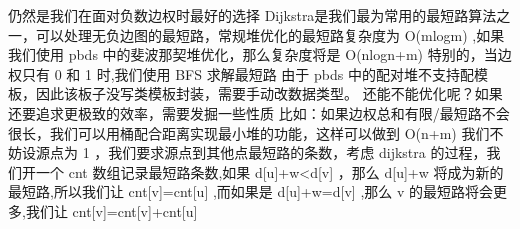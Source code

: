 {}\markdownRendererDollarSign{}仍然是我们在面对负数边权时最好的选择\markdownRendererInterblockSeparator
{}\markdownRendererInterblockSeparator
{}
\markdownRendererSectionEnd \markdownRendererSectionBegin
{}\markdownRendererInterblockSeparator
{}Dijkstra是我们最为常用的最短路算法之一，可以处理无负边图的最短路，常规堆优化的最短路复杂度为\markdownRendererDollarSign{} O(mlogm) \markdownRendererDollarSign{},如果我们使用\markdownRendererDollarSign{} pbds \markdownRendererDollarSign{}中的斐波那契堆优化，那么复杂度将是\markdownRendererDollarSign{} O(nlogn+m) \markdownRendererDollarSign{}\markdownRendererParagraphSeparator
{}特别的，当边权只有\markdownRendererDollarSign{} 0 \markdownRendererDollarSign{}和\markdownRendererDollarSign{} 1 \markdownRendererDollarSign{}时,我们使用\markdownRendererDollarSign{} BFS\markdownRendererSoftLineBreak
{}\markdownRendererDollarSign{}求解最短路\markdownRendererParagraphSeparator
{}由于\markdownRendererDollarSign{} pbds \markdownRendererDollarSign{}中的配对堆不支持配模板，因此该板子没写类模板封装，需要手动改数据类型。\markdownRendererInterblockSeparator
{}\markdownRendererInterblockSeparator
{}还能不能优化呢？如果还要追求更极致的效率，需要发掘一些性质\markdownRendererParagraphSeparator
{}比如：如果边权总和有限/最短路不会很长，我们可以用桶配合距离实现最小堆的功能，这样可以做到\markdownRendererDollarSign{} O(n+m) \markdownRendererDollarSign{}\markdownRendererInterblockSeparator
{}
\markdownRendererSectionEnd \markdownRendererSectionBegin
{}\markdownRendererInterblockSeparator
{}我们不妨设源点为\markdownRendererDollarSign{} 1 \markdownRendererDollarSign{}，我们要求源点到其他点最短路的条数，考虑\markdownRendererDollarSign{} dijkstra \markdownRendererDollarSign{}的过程，我们开一个\markdownRendererDollarSign{} cnt \markdownRendererDollarSign{}数组记录最短路条数,如果\markdownRendererDollarSign{} d[u]+w<d[v] \markdownRendererDollarSign{}，那么\markdownRendererDollarSign{} d[u]+w \markdownRendererDollarSign{}将成为新的最短路,所以我们让\markdownRendererDollarSign{} cnt[v]=cnt[u] \markdownRendererDollarSign{},而如果是\markdownRendererDollarSign{} d[u]+w=d[v] \markdownRendererDollarSign{},那么\markdownRendererDollarSign{} v \markdownRendererDollarSign{}的最短路将会更多,我们让\markdownRendererDollarSign{} cnt[v]=cnt[v]+cnt[u] \markdownRendererDollarSign{}\markdownRendererParagraphSeparator
